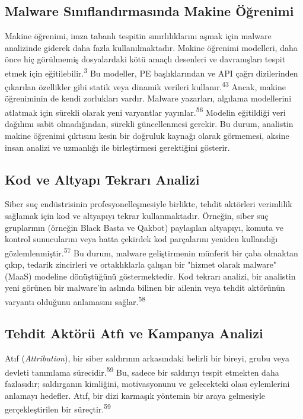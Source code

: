 \subsection{Malware Sınıflandırmasında Makine Öğrenimi}

Makine öğrenimi, imza tabanlı tespitin sınırlılıklarını aşmak için malware analizinde giderek daha fazla kullanılmaktadır. Makine öğrenimi modelleri, daha önce hiç görülmemiş dosyalardaki kötü amaçlı desenleri ve davranışları tespit etmek için eğitilebilir.\textsuperscript{3} Bu modeller, PE başlıklarından ve API çağrı dizilerinden çıkarılan özellikler gibi statik veya dinamik verileri kullanır.\textsuperscript{43} Ancak, makine öğreniminin de kendi zorlukları vardır. Malware yazarları, algılama modellerini atlatmak için sürekli olarak yeni varyantlar yayınlar.\textsuperscript{56} Modelin eğitildiği veri dağılımı sabit olmadığından, sürekli güncellenmesi gerekir. Bu durum, analistin makine öğrenimi çıktısını kesin bir doğruluk kaynağı olarak görmemesi, aksine insan analizi ve uzmanlığı ile birleştirmesi gerektiğini gösterir.

\subsection{Kod ve Altyapı Tekrarı Analizi}

Siber suç endüstrisinin profesyonelleşmesiyle birlikte, tehdit aktörleri verimlilik sağlamak için kod ve altyapıyı tekrar kullanmaktadır. Örneğin, siber suç gruplarının (örneğin Black Basta ve Qakbot) paylaşılan altyapıyı, komuta ve kontrol sunucularını veya hatta çekirdek kod parçalarını yeniden kullandığı gözlemlenmiştir.\textsuperscript{57} Bu durum, malware geliştirmenin münferit bir çaba olmaktan çıkıp, tedarik zincirleri ve ortaklıklarla çalışan bir "hizmet olarak malware" (MaaS) modeline dönüştüğünü göstermektedir. Kod tekrarı analizi, bir analistin yeni görünen bir malware'in aslında bilinen bir ailenin veya tehdit aktörünün varyantı olduğunu anlamasını sağlar.\textsuperscript{58}

\subsection{Tehdit Aktörü Atfı ve Kampanya Analizi}

Atıf (\textit{Attribution}), bir siber saldırının arkasındaki belirli bir bireyi, grubu veya devleti tanımlama sürecidir.\textsuperscript{59} Bu, sadece bir saldırıyı tespit etmekten daha fazlasıdır; saldırganın kimliğini, motivasyonunu ve gelecekteki olası eylemlerini anlamayı hedefler. Atıf, bir dizi karmaşık yöntemin bir araya gelmesiyle gerçekleştirilen bir süreçtir.\textsuperscript{59}

